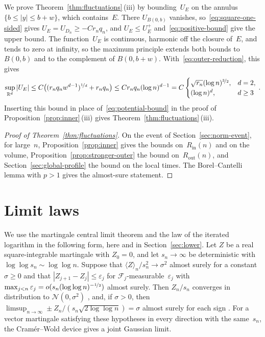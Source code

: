 \documentclass[11pt]{amsart}
\theoremstyle{plain}
\theoremstyle{definition}
\newcommand{\R}{\mathbb R}
\newcommand{\nf}{\nicefrac}
\newcommand{\Rin}{R_{\mathrm{in}}}
\newcommand{\Rout}{R_{\mathrm{out}}}
\numberwithin{equation}{section}
\begin{document}
We prove Theorem~\ref{thm:fluctuations}\,(iii) by bounding~$U_E$ on the annulus $\{b\leq|y|\leq b+w\}$, which contains~$E$. There $U_{B(0,b)}$ vanishes, so~\eqref{eq:square-one-sided} gives $U_E=U_{D_n}\geq-Cr_nq_n$, and $U_E\leq U_E^+$ and~\eqref{eq:positive-bound} give the upper bound. The function~$U_E$ is continuous, harmonic off the closure of~$E$, and tends to zero at infinity, so the maximum principle extends both bounds to $B(0,b)$ and to the complement of $B(0,b+w)$. With~\eqref{eq:outer-reduction}, this gives
\begin{equation*}
\sup_{\R^d}|U_E|\leq C\bigl((r_nq_n w^{d-1})^{\nf1d}+r_nq_n\bigr)
\leq Cr_nq_n(\log n)^{d-1}
=C\begin{cases}\sqrt{r_n}(\log n)^{\nf32},&d=2,\\(\log n)^d,&d\geq3\end{cases}\, .
\end{equation*}
Inserting this bound in place of~\eqref{eq:potential-bound} in the proof of Proposition~\ref{prop:inner}\,(iii) gives Theorem~\ref{thm:fluctuations}\,(iii).

\begin{proof}[Proof of Theorem~\ref{thm:fluctuations}]
On the event of Section~\ref{sec:norm-event}, for large~$n$, Proposition~\ref{prop:inner} gives the bounds on~$\Rin(n)$ and on the volume, Proposition~\ref{prop:stronger-outer} the bound on~$\Rout(n)$, and Section~\ref{sec:global-profile} the bound on the local times. The Borel--Cantelli lemma with $p>1$ gives the almost-sure statement.
\end{proof}

\section{Limit laws}\label{sec:sharp}

We use the martingale central limit theorem and the law of the iterated logarithm in the following form, here and in Section~\ref{sec:lower}. Let $Z$ be a real square-integrable martingale with $Z_0=0$, and let $s_n\to\infty$ be deterministic with $\log\log s_n\sim\log\log n$. Suppose that $\langle Z\rangle_n/s_n^2\to\sigma^2$ almost surely for a constant $\sigma\geq0$ and that $|Z_{j+1}-Z_j|\leq\varepsilon_j$ for $\mathcal F_j$-measurable~$\varepsilon_j$ with $\max_{j<n}\varepsilon_j=o(s_n(\log\log n)^{-\nf12})$ almost surely. Then $Z_n/s_n$ converges in distribution to $\mathcal N(0,\sigma^2)$ \citep[Corollary~3.1]{HallHeyde1980}, and, if $\sigma>0$, then $\limsup_{n\to\infty}\pm Z_n/(s_n\sqrt{2\log\log n})=\sigma$ almost surely for each sign \citep[Theorems~1 and~2]{Stout1970}. For a vector martingale satisfying these hypotheses in every direction with the same~$s_n$, the Cram\'er--Wold device gives a joint Gaussian limit.
\end{document}
